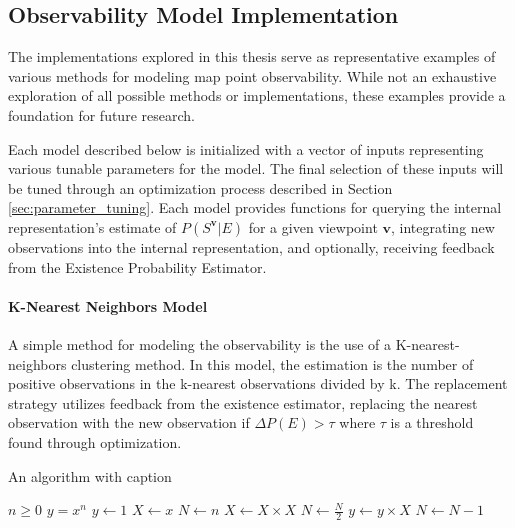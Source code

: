 \subsection{Observability Model Implementation}

The implementations explored in this thesis serve as representative examples of various methods for modeling map point observability. While not an exhaustive exploration of all possible methods or implementations, these examples provide a foundation for future research.

Each model described below is initialized with a vector of inputs representing various tunable parameters for the model. The final selection of these inputs will be tuned through an optimization process described in Section \ref{sec:parameter_tuning}. Each model provides functions for querying the internal representation's estimate of $P(S^{\boldsymbol{v}}|E)$ for a given viewpoint $\boldsymbol{v}$, integrating new observations into the internal representation, and optionally, receiving feedback from the Existence Probability Estimator.

\paragraph{K-Nearest Neighbors Model}

A simple method for modeling the observability is the use of a K-nearest-neighbors clustering method. In this model, the estimation is the number of positive observations in the k-nearest observations divided by k. The replacement strategy utilizes feedback from the existence estimator, replacing the nearest observation with the new observation if $\Delta P(E) > \tau$ where $\tau$ is a threshold found through optimization.

\begin{algorithm}
    \caption{An algorithm with caption}\label{alg:cap}
    \begin{algorithmic}
        \Require $n \geq 0$
        \Ensure $y = x^n$
        \State $y \gets 1$
        \State $X \gets x$
        \State $N \gets n$
        \State $X \gets X \times X$
        \State $N \gets \frac{N}{2}$  
        \State $y \gets y \times X$
        \State $N \gets N - 1$
        \EndIf
        \EndWhile
    \end{algorithmic}
\end{algorithm}

